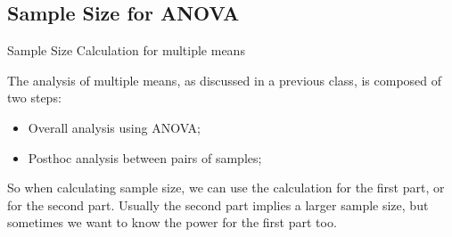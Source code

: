 %
%
%
%
%

\subsection{Sample Size for ANOVA}

\begin{frame}{Sample Size Calculation for multiple means}

  The analysis of multiple means, as discussed in a previous class, is composed of two steps:
  \begin{itemize}
  \item Overall analysis using ANOVA;
  \item Posthoc analysis between pairs of samples;
  \end{itemize}\bigskip

  So when calculating sample size, we can use the calculation for the
  first part, or for the second part. Usually the second part implies
  a larger sample size, but sometimes we want to know the power for
  the first part too.  
\end{frame}

